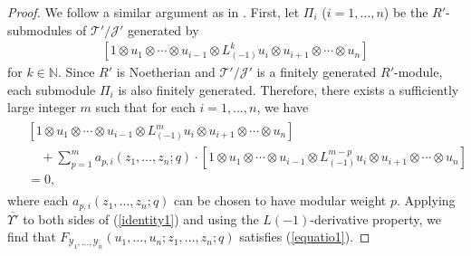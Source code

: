 \documentclass[9pt]{amsart}
\newcommand{\T}{\mathcal{T}}
\newcommand{\J}{\mathcal{J}}
\begin{document}
\begin{proof}
We follow a similar argument as in \cite[Theorem 3.9]{huang2005differential}. First, let $\Pi_{i}$ ($i = 1, \dots, n$) be the $R'$-submodules of $\T'/\J'$ generated by
\begin{align*}
    \left[1 \otimes u_{1} \otimes \cdots \otimes u_{i-1} \otimes L^{k}_{(-1)} u_{i} \otimes u_{i+1} \otimes \cdots \otimes u_{n} \right]
\end{align*}
for $k \in \mathbb{N}$. Since $R'$ is Noetherian and $\T'/\J'$ is a finitely generated $R'$-module, each submodule $\Pi_i$ is also finitely generated. Therefore, there exists a sufficiently large integer $m$ such that for each $i = 1, \dots, n$, we have
\begin{align}\label{identity1}
\begin{split}
    &\left[
    1 \otimes u_1 \otimes \cdots \otimes u_{i-1} \otimes
    L^m_{(-1)} u_i \otimes u_{i+1} \otimes \cdots \otimes u_n
    \right] \\
    &\quad + \sum_{p=1}^{m} a_{p,i}(z_1, \dots, z_n; q) \cdot
    \left[
    1 \otimes u_1 \otimes \cdots \otimes u_{i-1} \otimes
    L^{m-p}_{(-1)} u_i \otimes u_{i+1} \otimes \cdots \otimes u_n
    \right] \\
    &= 0,
\end{split}
\end{align}
where each $a_{p,i}(z_{1}, \dots, z_{n}; q)$ can be chosen to have modular weight $p$. Applying $\overline{\Upsilon'}$ to both sides of (\ref{identity1}) and using the $L(-1)$-derivative property, we find that $F_{\mathcal{Y}_{1}, \dots, \mathcal{Y}_{n}}(u_1, \dots, u_n; z_1, \dots, z_n; q)$ satisfies (\ref{equatio1}).


\end{proof}
\end{document}

